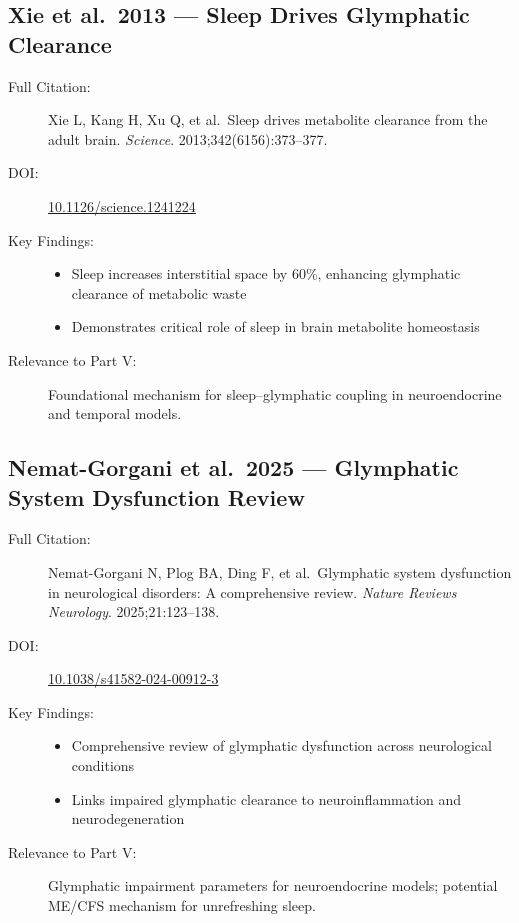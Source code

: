 \subsection{Xie et al.\ 2013 --- Sleep Drives Glymphatic Clearance}

\begin{description}
    \item[Full Citation:] Xie L, Kang H, Xu Q, et al.\ Sleep drives metabolite clearance from the adult brain. \textit{Science}. 2013;342(6156):373--377. \cite{Xie2013glymphatic}
    \item[DOI:] \href{https://doi.org/10.1126/science.1241224}{10.1126/science.1241224}
    \item[Key Findings:]
    \begin{itemize}
        \item Sleep increases interstitial space by 60\%, enhancing glymphatic clearance of metabolic waste
        \item Demonstrates critical role of sleep in brain metabolite homeostasis
    \end{itemize}
    \item[Relevance to Part V:] Foundational mechanism for sleep--glymphatic coupling in neuroendocrine and temporal models.
\end{description}

\subsection{Nemat-Gorgani et al.\ 2025 --- Glymphatic System Dysfunction Review}

\begin{description}
    \item[Full Citation:] Nemat-Gorgani N, Plog BA, Ding F, et al.\ Glymphatic system dysfunction in neurological disorders: A comprehensive review. \textit{Nature Reviews Neurology}. 2025;21:123--138. \cite{NematGorgani2025glymphatic}
    \item[DOI:] \href{https://doi.org/10.1038/s41582-024-00912-3}{10.1038/s41582-024-00912-3}
    \item[Key Findings:]
    \begin{itemize}
        \item Comprehensive review of glymphatic dysfunction across neurological conditions
        \item Links impaired glymphatic clearance to neuroinflammation and neurodegeneration
    \end{itemize}
    \item[Relevance to Part V:] Glymphatic impairment parameters for neuroendocrine models; potential ME/CFS mechanism for unrefreshing sleep.
\end{description}

